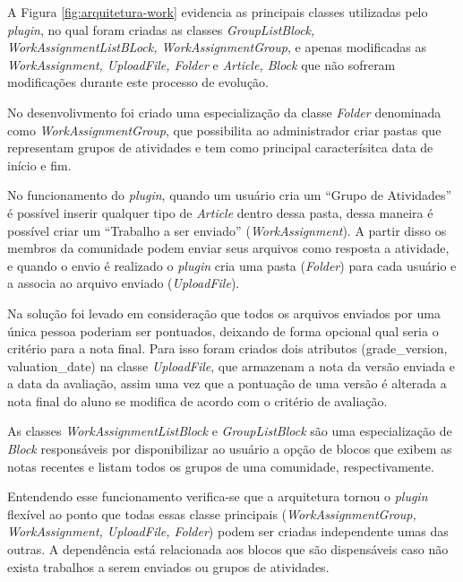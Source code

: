 A Figura \ref{fig:arquitetura-work} evidencia as principais classes utilizadas pelo \textit{plugin}, no qual foram criadas as classes \textit{GroupListBlock, WorkAssignmentListBLock, WorkAssignmentGroup}, e apenas modificadas as \textit{WorkAssignment, UploadFile, Folder} e \textit{Article, Block} que não sofreram modificações durante este processo de evolução.

No desenvolivmento foi criado uma especialização da classe \textit{Folder} denominada como \textit{WorkAssignmentGroup}, que possibilita ao administrador criar pastas que representam grupos de atividades e tem como principal caracterísitca data de início e fim.

No funcionamento do \textit{plugin}, quando um usuário cria um ``Grupo de Atividades'' é possível inserir qualquer tipo de \textit{Article} dentro dessa pasta, dessa maneira é possível criar um ``Trabalho a ser enviado'' (\textit{WorkAssignment}). A partir disso os membros da comunidade podem enviar seus arquivos como resposta a atividade, e quando o envio é realizado o \textit{plugin} cria uma pasta (\textit{Folder}) para cada usuário e a associa ao arquivo enviado (\textit{UploadFile}). 

Na solução foi levado em consideração que todos os arquivos enviados por uma única pessoa poderiam ser pontuados, deixando de forma opcional qual seria o critério para a nota final. Para isso foram criados dois atributos (grade\_version, valuation\_date) na classe \textit{UploadFile}, que armazenam a nota da versão enviada e a data da avaliação, assim uma vez que a pontuação de uma versão é alterada a nota final do aluno se modifica de acordo com o critério de avaliação.

As classes \textit{WorkAssignmentListBlock} e \textit{GroupListBlock} são uma especialização de \textit{Block} responsáveis por disponibilizar ao usuário a opção de blocos que exibem as notas recentes e listam todos os grupos de uma comunidade, respectivamente.

Entendendo esse funcionamento verifica-se que a arquitetura tornou o \textit{plugin} flexível ao ponto que todas essas classe principais (\textit{WorkAssignmentGroup, WorkAssignment, UploadFile, Folder}) podem ser criadas independente umas das outras. A dependência está relacionada aos blocos que são dispensáveis caso não exista trabalhos a serem enviados ou grupos de atividades.


